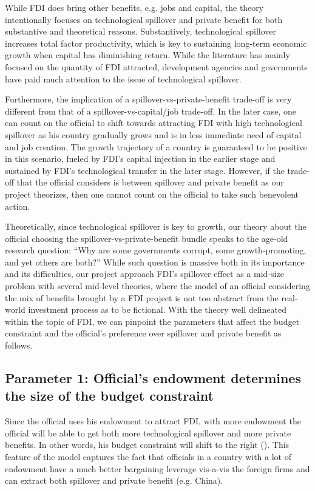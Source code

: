 While FDI does bring other benefits, e.g. jobs and capital, the theory intentionally focuses on technological spillover and private benefit for both substantive and theoretical reasons. Substantively, technological spillover increases total factor productivity, which is key to sustaining long-term economic growth when capital has diminishing return. While the literature has mainly focused on the quantity of FDI attracted, development agencies and governments have paid much attention to the issue of technological spillover. 

Furthermore, the implication of a spillover-vs-private-benefit trade-off is very different from that of a spillover-vs-capital/job trade-off. In the later case, one can count on the official to shift towards attracting FDI with high technological spillover as his country gradually grows and is in less immediate need of capital and job creation. The growth trajectory of a country is guaranteed to be positive in this scenario, fueled by FDI's capital injection in the earlier stage and sustained by FDI's technological transfer in the later stage. However, if the trade-off that the official considers is between spillover and private benefit as our project theorizes, then one cannot count on the official to take such benevolent action.

Theoretically, since technological spillover is key to growth, our theory about the official choosing the spillover-vs-private-benefit bundle speaks to the age-old research question: ``Why are some governments corrupt, some growth-promoting, and yet others are both?'' While such question is massive both in its importance and its difficulties, our project approach FDI's spillover effect as a mid-size problem with several mid-level theories, where the model of an official considering the mix of benefits brought by a FDI project is not too abstract from the real-world investment process as to be fictional. With the theory well delineated within the topic of FDI, we can pinpoint the parameters that affect the budget constraint and the official's preference over spillover and private benefit as follows.

\subsection{Parameter 1: Official's endowment determines the size of the budget constraint}

Since the official uses his endowment to attract FDI, with more endowment the official will be able to get both more technological spillover and more private benefits. In other words, his budget constraint will shift to the right (). This feature of the model captures the fact that officials in a country with a lot of endowment have a much better bargaining leverage vis-a-vis the foreign firms and can extract both spillover and private benefit (e.g. China).

